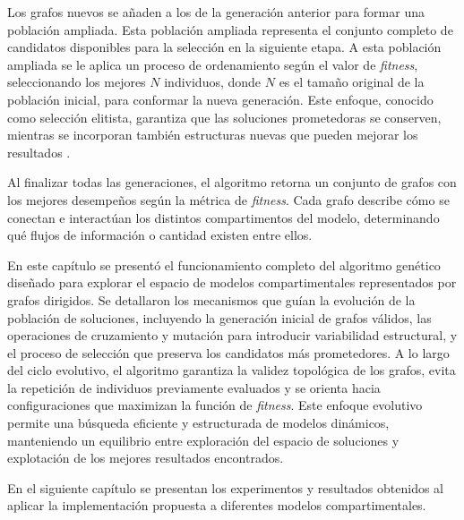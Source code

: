 Los grafos nuevos se a\~naden a los de la generación anterior para formar una población ampliada. Esta población ampliada representa el conjunto completo de 
candidatos disponibles para la selección en la siguiente etapa. A esta población ampliada se le aplica un proceso de ordenamiento según el valor de \textit{fitness}, 
seleccionando los mejores $N$ individuos, donde $N$ es el tamaño original de la población inicial, para conformar la nueva generación. Este enfoque, conocido como 
selección elitista, garantiza que las soluciones prometedoras se conserven, mientras se incorporan también estructuras nuevas que pueden mejorar los resultados 
\cite{Eiben2015, Goldberg1989}.

Al finalizar todas las generaciones, el algoritmo retorna un conjunto de grafos con los mejores desempeños según la métrica de \textit{fitness}. Cada grafo describe 
cómo se conectan e interactúan los distintos compartimentos del modelo, determinando qué flujos de información o cantidad existen entre ellos.

En este capítulo se presentó el funcionamiento completo del algoritmo genético diseñado para explorar el espacio de modelos compartimentales representados por grafos 
dirigidos. Se detallaron los mecanismos que guían la evolución de la población de soluciones, incluyendo la generación inicial de grafos válidos, las operaciones de 
cruzamiento y mutación para introducir variabilidad estructural, y el proceso de selección que preserva los candidatos más prometedores. A lo largo del ciclo evolutivo, 
el algoritmo garantiza la validez topológica de los grafos, evita la repetición de individuos previamente evaluados y se orienta hacia configuraciones que maximizan la 
función de \textit{fitness}. Este enfoque evolutivo permite una búsqueda eficiente y estructurada de modelos dinámicos, manteniendo un equilibrio entre 
exploración del espacio de soluciones y explotación de los mejores resultados encontrados.

En el siguiente capítulo se presentan los experimentos y resultados obtenidos al aplicar la implementación propuesta a diferentes modelos compartimentales.